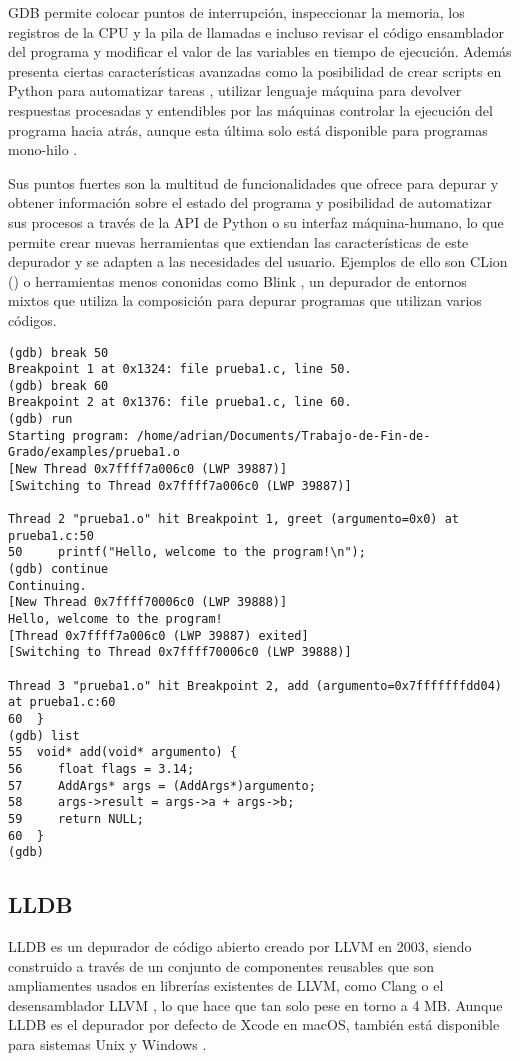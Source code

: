 \gls{GDB} permite colocar puntos de interrupción, inspeccionar la memoria, los registros de la CPU y la pila de llamadas e incluso revisar el código ensamblador del programa y modificar el valor de las variables en tiempo de ejecución. Además presenta ciertas características avanzadas como la posibilidad de crear \glspl{script} en \gls{Python} para automatizar tareas \cite{GDBPython}, utilizar lenguaje máquina para devolver respuestas procesadas y entendibles por las máquinas \cite{GDB/MI} controlar la ejecución del programa hacia atrás, aunque esta última solo está disponible para programas mono-hilo \cite{GDBReversing}.

Sus puntos fuertes son la multitud de funcionalidades que ofrece para depurar y obtener información sobre el estado del programa y posibilidad de automatizar sus procesos a través de la \gls{API} de \gls{Python} o su interfaz máquina-humano, lo que permite crear nuevas herramientas que extiendan las características de este depurador y se adapten a las necesidades del usuario. Ejemplos de ello son \gls{CLion} () o herramientas menos cononidas como Blink \cite{Blink}, un depurador de entornos mixtos que utiliza la composición para depurar programas que utilizan varios códigos.

\begin{lstlisting}[caption={Muestra del depurador \gls{GDB}}]
(gdb) break 50
Breakpoint 1 at 0x1324: file prueba1.c, line 50.
(gdb) break 60
Breakpoint 2 at 0x1376: file prueba1.c, line 60.
(gdb) run
Starting program: /home/adrian/Documents/Trabajo-de-Fin-de-Grado/examples/prueba1.o 
[New Thread 0x7ffff7a006c0 (LWP 39887)]
[Switching to Thread 0x7ffff7a006c0 (LWP 39887)]

Thread 2 "prueba1.o" hit Breakpoint 1, greet (argumento=0x0) at prueba1.c:50
50	   printf("Hello, welcome to the program!\n");
(gdb) continue
Continuing.
[New Thread 0x7ffff70006c0 (LWP 39888)]
Hello, welcome to the program!
[Thread 0x7ffff7a006c0 (LWP 39887) exited]
[Switching to Thread 0x7ffff70006c0 (LWP 39888)]

Thread 3 "prueba1.o" hit Breakpoint 2, add (argumento=0x7fffffffdd04) at prueba1.c:60
60	}
(gdb) list
55	void* add(void* argumento) {
56	   float flags = 3.14;
57	   AddArgs* args = (AddArgs*)argumento;
58	   args->result = args->a + args->b;
59	   return NULL;
60	}
(gdb) 
\end{lstlisting}

\subsection{LLDB}{\label{subsec:lldb}}
\gls{LLDB} es un \gls{depurador} de código abierto creado por \gls{LLVM} en 2003, siendo construido a través de un conjunto de componentes reusables que son ampliamentes usados en librerías existentes de \gls{LLVM}, como \gls{Clang} o el desensamblador \gls{LLVM} \cite{LLDB}, lo que hace que tan solo pese en torno a 4 MB.
Aunque \gls{LLDB} es el depurador por defecto de \gls{Xcode} en \gls{macOS}, también está disponible para sistemas \gls{Unix} y Windows \cite{LLDB}.

